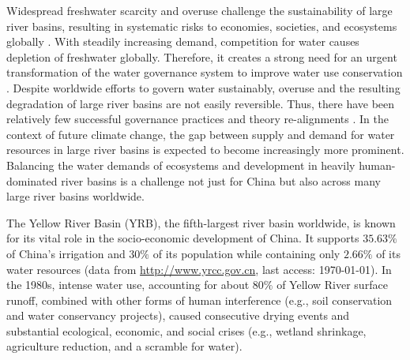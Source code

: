 Widespread freshwater scarcity and overuse challenge the sustainability of large river basins, resulting in systematic risks to economies, societies, and ecosystems globally \cite{distefano2017, dolan2021, xu2020b, mekonnen2016}.
With steadily increasing demand, competition for water causes depletion of freshwater globally. Therefore, it creates a strong need for an urgent transformation of the water governance system to improve water use conservation \cite{gleick2010, ziolkowska2016, wang2019d}.
Despite worldwide efforts to govern water sustainably, overuse and the resulting degradation of large river basins are not easily reversible. Thus, there have been relatively few successful governance practices and theory re-alignments
\cite{giuliani2013, falkenmark2019, jaeger2019}.
In the context of future climate change, the gap between supply and demand for water resources in large river basins is expected to become increasingly more prominent.
Balancing the water demands of ecosystems and development in heavily human-dominated river basins is a challenge not just for China but also across many large river basins worldwide.

The Yellow River Basin (YRB), the fifth-largest river basin worldwide, is known for its vital role in the socio-economic development of China.
It supports $35.63\%$ of China's irrigation and $30\%$ of its population while containing only $2.66\%$ of its water resources (data from \href{http://www.yrcc.gov.cn}{http://www.yrcc.gov.cn}, last access: \today).
In the 1980s, intense water use, accounting for about $80\%$ of Yellow River surface runoff, combined with other forms of human interference (e.g., soil conservation and water conservancy projects), caused consecutive drying events and substantial ecological, economic, and social crises (e.g., wetland shrinkage, agriculture reduction, and a scramble for water).

